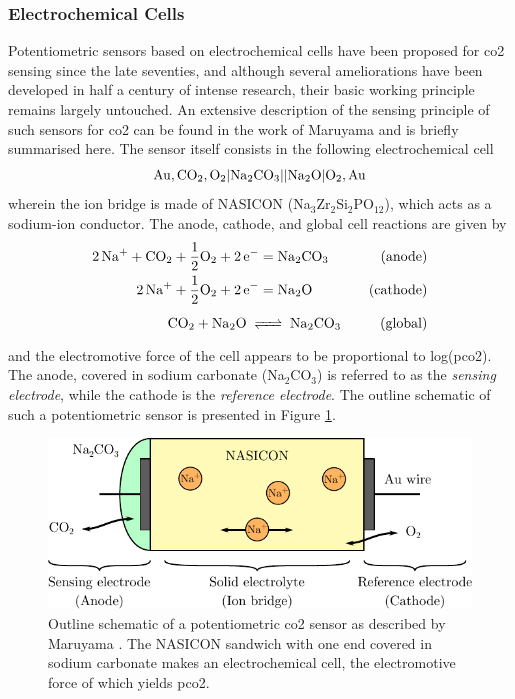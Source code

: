 \subsubsection{Electrochemical Cells}\label{subsect:choos:review:electrochem_cell}

Potentiometric sensors based on electrochemical cells have been proposed for \gls{co2} sensing since the late seventies\cite{gauthier1977}, and although several ameliorations have been developed in half a century of intense research, their basic working principle remains largely untouched. An extensive description of the sensing principle of such sensors for \gls{co2} can be found in the work of Maruyama \etal{}\cite{maruyama1987} and is briefly summarised here. The sensor itself consists in the following electrochemical cell
\begin{equation}
	\ce{Au,CO_2,O_2|Na_2CO_3||Na_2O|O_2,Au}
\end{equation}
wherein the ion bridge is made of NASICON (Na$_3$Zr$_2$Si$_2$PO$_{12}$)\cite{maruyama1985}, which acts as a sodium-ion conductor. The anode, cathode, and global cell reactions are given by
\begin{equation}
	\begin{aligned}
		\ce{2Na^+ + CO_2 + \frac{1}{2}O_2 + 2e^-} \crel{=} \ce{Na2CO3} \quad & \text{(anode)} \\
		\ce{2Na^+ + \frac{1}{2}O_2 + 2e^-} \crel{=} \ce{Na2O} \quad & \text{(cathode)} \\
		\vphantom{\frac{1}{2}}\ce{CO2 + Na2O} \crel{\ce{<=>}} \ce{Na2CO3} \quad & \text{(global)}
	\end{aligned}
\end{equation}
and the electromotive force of the cell appears to be proportional to log(\gls{pco2}). The anode, covered in sodium carbonate (Na$_2$CO$_3$) is referred to as the \emph{sensing electrode}, while the cathode is the \emph{reference electrode}. The outline schematic of such a potentiometric sensor is presented in Figure \ref{fig:choos:review:pot_sens}.

\begin{figure}
	\centering
	\includegraphics{1_main_matter/choos_figures/review/pot_sensor}
	\caption[Outline schematic of a potentiometric \gls{co2} sensor.]{Outline schematic of a potentiometric \gls{co2} sensor as described by Maruyama \etal{}\cite{maruyama1987}. The NASICON sandwich with one end covered in sodium carbonate makes an electrochemical cell, the electromotive force of which yields \gls{pco2}.}
	\label{fig:choos:review:pot_sens}
\end{figure}

